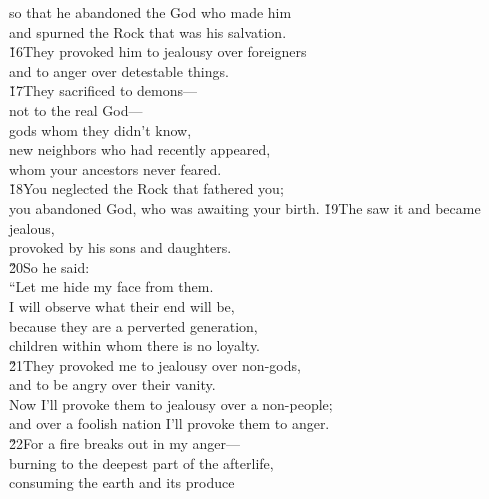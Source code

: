 \begin{poetry}
\poemll    so that he abandoned the God who made him \\
\poemlll       and spurned the Rock that was his salvation. \\
\poeml \v{16}They provoked him to jealousy over foreigners \\
\poemll    and to anger over detestable things. \\
\poeml \v{17}They sacrificed to demons--- \\
\poemll    not to the real God--- \\
\poeml gods whom they didn't know, \\
\poemll    new neighbors who had recently appeared, \\
\poemlll       whom your ancestors never feared. \\
\poeml \v{18}You neglected the Rock that fathered you; \\
\poemll    you abandoned God, who was awaiting your birth.
\poeml \v{19}The  saw it and became jealous, \\
\poemll    provoked by his sons and daughters. \\
\poeml \v{20}So he said: \\
\poeml ``Let me hide my face from them. \\
\poemll    I will observe what their end will be, \\
\poeml because they are a perverted generation, \\
\poemll    children within whom there is no loyalty. \\
\poeml \v{21}They provoked me to jealousy over non-gods, \\
\poemll    and to be angry over their vanity. \\
\poeml Now I'll provoke them to jealousy over a non-people; \\
\poemll    and over a foolish nation I'll provoke them to anger. \\
\poeml \v{22}For a fire breaks out in my anger--- \\
\poemll    burning to the deepest part of the afterlife, \\
\poeml consuming the earth and its produce \\

\end{poetry}
